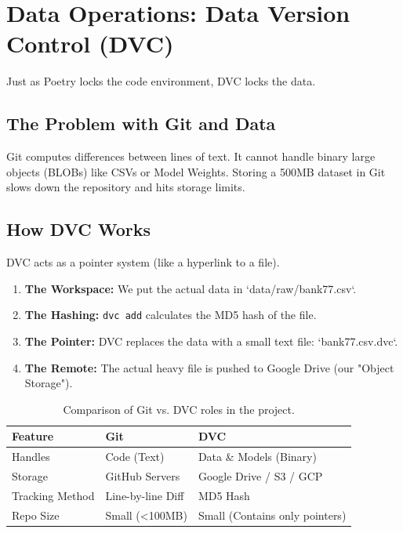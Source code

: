 \documentclass[11pt, a4paper]{article}
\begin{document}
\section{Data Operations: Data Version Control (DVC)}

Just as Poetry locks the code environment, DVC locks the data.

\subsection{The Problem with Git and Data}
Git computes differences between lines of text. It cannot handle binary large objects (BLOBs) like CSVs or Model Weights. Storing a 500MB dataset in Git slows down the repository and hits storage limits.

\subsection{How DVC Works}
DVC acts as a pointer system (like a hyperlink to a file). 

\begin{enumerate}
    \item \textbf{The Workspace:} We put the actual data in `data/raw/bank77.csv`.
    \item \textbf{The Hashing:} \texttt{dvc add} calculates the MD5 hash of the file.
    \item \textbf{The Pointer:} DVC replaces the data with a small text file: `bank77.csv.dvc`.
    \item \textbf{The Remote:} The actual heavy file is pushed to Google Drive (our "Object Storage").
\end{enumerate}

\begin{table}[h]
\centering
\begin{tabular}{@{}lll@{}}
\toprule
\textbf{Feature} & \textbf{Git} & \textbf{DVC} \\ \midrule
Handles & Code (Text) & Data \& Models (Binary) \\
Storage & GitHub Servers & Google Drive / S3 / GCP \\
Tracking Method & Line-by-line Diff & MD5 Hash \\
Repo Size & Small (<100MB) & Small (Contains only pointers) \\ \bottomrule
\end{tabular}
\caption{Comparison of Git vs. DVC roles in the project.}
\end{table}
\end{document}

